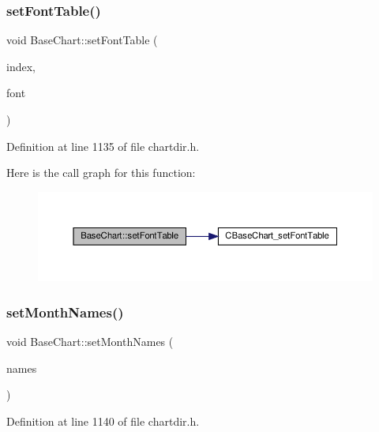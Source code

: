 \subsubsection{\texorpdfstring{set\+Font\+Table()}{setFontTable()}}
{\footnotesize\ttfamily void Base\+Chart\+::set\+Font\+Table (\begin{DoxyParamCaption}\item[{int}]{index,  }\item[{const char $\ast$}]{font }\end{DoxyParamCaption})\hspace{0.3cm}{\ttfamily [inline]}}



Definition at line 1135 of file chartdir.\+h.

Here is the call graph for this function\+:
\nopagebreak
\begin{figure}[H]
\begin{center}
\leavevmode
\includegraphics[width=350pt]{class_base_chart_ad0c87a37505dbfcac5a20286053552e5_cgraph}
\end{center}
\end{figure}
\mbox{\label{class_base_chart_ab4eb2087f764057db74611a6fdc1fab7}} 
\subsubsection{\texorpdfstring{set\+Month\+Names()}{setMonthNames()}}
{\footnotesize\ttfamily void Base\+Chart\+::set\+Month\+Names (\begin{DoxyParamCaption}\item[{\hyperlink{class_string_array}{String\+Array}}]{names }\end{DoxyParamCaption})\hspace{0.3cm}{\ttfamily [inline]}}



Definition at line 1140 of file chartdir.\+h.

